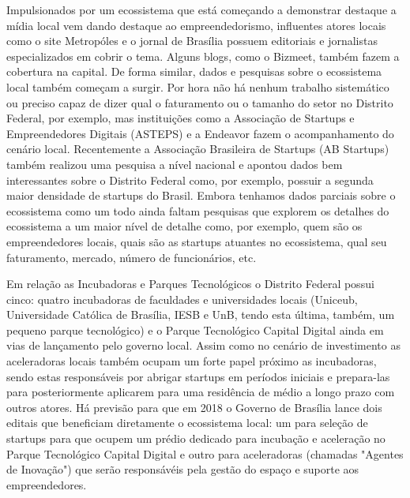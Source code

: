 Impulsionados por um ecossistema que está começando a demonstrar destaque a mídia local vem dando destaque ao empreendedorismo, influentes atores locais como o site Metropóles e o jornal de Brasília possuem editoriais e jornalistas especializados em cobrir o tema. Alguns blogs, como o Bizmeet, também fazem a cobertura na capital. De forma similar, dados e pesquisas sobre o ecossistema local também começam a surgir. Por hora não há nenhum trabalho sistemático ou preciso capaz de dizer qual o faturamento ou o tamanho do setor no Distrito Federal, por exemplo, mas instituições como a Associação de Startups e Empreendedores Digitais (ASTEPS) e a Endeavor fazem o acompanhamento do cenário local. Recentemente a Associação Brasileira de Startups (AB Startups) também realizou uma pesquisa a nível nacional e apontou dados bem interessantes sobre o Distrito Federal como, por exemplo, possuir a segunda maior densidade de startups do Brasil. Embora tenhamos dados parciais sobre o ecossistema como um todo ainda faltam pesquisas que explorem os detalhes do ecossistema a um maior nível de detalhe como, por exemplo, quem são os empreendedores locais, quais são as startups atuantes no ecossistema, qual seu faturamento, mercado, número de funcionários, etc.

Em relação as Incubadoras e Parques Tecnológicos o Distrito Federal possui cinco: quatro incubadoras de faculdades e universidades locais (Uniceub, Universidade Católica de Brasília, IESB e UnB, tendo esta última, também, um pequeno parque tecnológico) e o Parque Tecnológico Capital Digital ainda em vias de lançamento pelo governo local. Assim como no cenário de investimento as aceleradoras locais também ocupam um forte papel próximo as incubadoras, sendo estas responsáveis por abrigar startups em períodos iniciais e prepara-las para posteriormente aplicarem para uma residência de médio a longo prazo com outros atores. Há previsão para que em 2018 o Governo de Brasília lance dois editais que beneficiam diretamente o ecossistema local: um para seleção de startups para que ocupem um prédio dedicado para incubação e aceleração no Parque Tecnológico Capital Digital e outro para aceleradoras (chamadas "Agentes de Inovação") que serão responsávéis pela gestão do espaço e suporte aos empreendedores.

